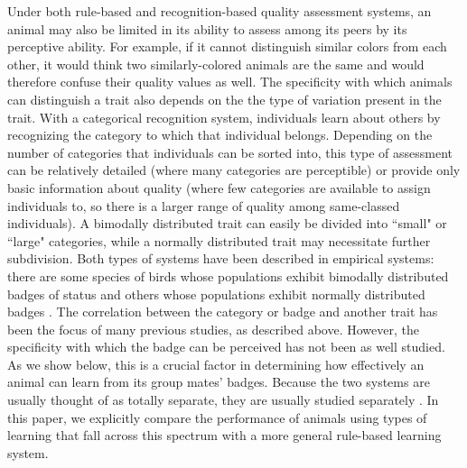 Under both rule-based and recognition-based quality assessment systems, an animal may also be limited in its ability to assess among its peers by its perceptive ability. For example, if it cannot distinguish similar colors from each other, it would think two similarly-colored animals are the same and would therefore confuse their quality values as well. The specificity with which animals can distinguish a trait also depends on the the type of variation present in the trait. With a categorical recognition system, individuals learn about others by recognizing the category to which that individual belongs. Depending on the number of categories that individuals can be sorted into, this type of assessment can be relatively detailed (where many categories are perceptible) or provide only basic information about quality (where few categories are available to assign individuals to, so there is a larger range of quality among same-classed individuals). A bimodally distributed trait can easily be divided into ``small" or ``large" categories, while a normally distributed trait may necessitate further subdivision. Both types of systems have been described in empirical systems: there are some species of birds whose populations exhibit bimodally distributed badges of status and others whose populations exhibit normally distributed badges \citep{Ripoll:2004vn}. The correlation between the category or badge and another trait has been the focus of many previous studies, as described above. However, the specificity with which the badge can be perceived has not been as well studied. As we show below, this is a crucial factor in determining how effectively an animal can learn from its group mates' badges. Because the two systems are usually thought of as totally separate, they are usually studied separately \citep{sheehan2016evotradeoff}. In this paper, we explicitly compare the performance of animals using types of learning that fall across this spectrum with a more general rule-based learning system.

